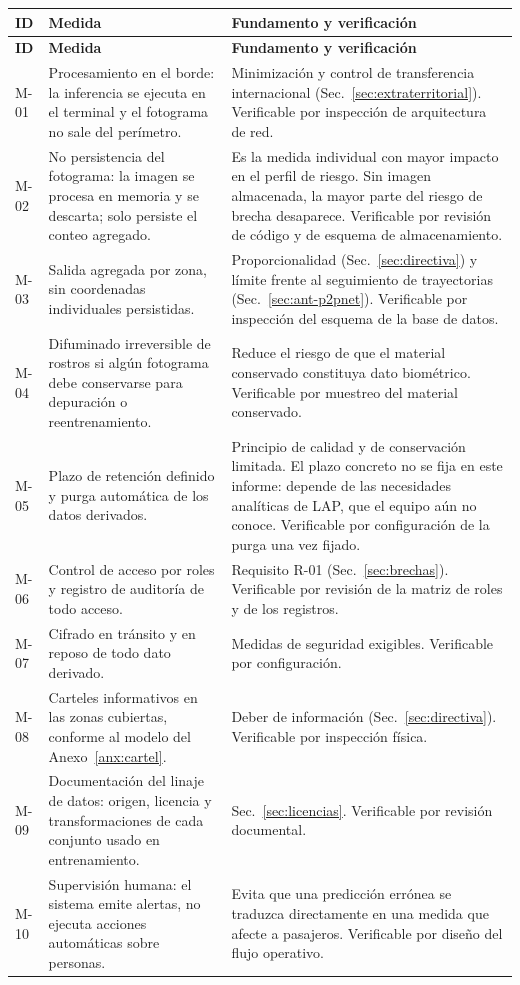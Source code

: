 {\footnotesize
\begin{longtable}{@{}L{1.1cm}L{4.3cm}L{6.6cm}@{}}
\toprule
\textbf{ID} & \textbf{Medida} & \textbf{Fundamento y verificación} \\
\midrule
\endfirsthead
\toprule
\textbf{ID} & \textbf{Medida} & \textbf{Fundamento y verificación} \\
\midrule
\endhead
\bottomrule
\endfoot
M-01 & Procesamiento en el borde: la inferencia se ejecuta en el
terminal y el fotograma no sale del perímetro. &
Minimización y control de transferencia internacional
(Sec.~\ref{sec:extraterritorial}). Verificable por inspección de
arquitectura de red. \\
\addlinespace
M-02 & No persistencia del fotograma: la imagen se procesa en memoria y
se descarta; solo persiste el conteo agregado. &
Es la medida individual con mayor impacto en el perfil de riesgo. Sin
imagen almacenada, la mayor parte del riesgo de brecha desaparece.
Verificable por revisión de código y de esquema de almacenamiento. \\
\addlinespace
M-03 & Salida agregada por zona, sin coordenadas individuales
persistidas. &
Proporcionalidad (Sec.~\ref{sec:directiva}) y límite frente al
seguimiento de trayectorias (Sec.~\ref{sec:ant-p2pnet}). Verificable por
inspección del esquema de la base de datos. \\
\addlinespace
M-04 & Difuminado irreversible de rostros si algún fotograma debe
conservarse para depuración o reentrenamiento. &
Reduce el riesgo de que el material conservado constituya dato
biométrico. Verificable por muestreo del material conservado. \\
\addlinespace
M-05 & Plazo de retención definido y purga automática de los datos
derivados. &
Principio de calidad y de conservación limitada. El plazo concreto no se
fija en este informe: depende de las necesidades analíticas de LAP, que
el equipo aún no conoce. Verificable por configuración de la purga una
vez fijado. \\
\addlinespace
M-06 & Control de acceso por roles y registro de auditoría de todo
acceso. &
Requisito R-01 (Sec.~\ref{sec:brechas}). Verificable por revisión de la
matriz de roles y de los registros. \\
\addlinespace
M-07 & Cifrado en tránsito y en reposo de todo dato derivado. &
Medidas de seguridad exigibles. Verificable por configuración. \\
\addlinespace
M-08 & Carteles informativos en las zonas cubiertas, conforme al modelo
del Anexo~\ref{anx:cartel}. &
Deber de información (Sec.~\ref{sec:directiva}). Verificable por
inspección física. \\
\addlinespace
M-09 & Documentación del linaje de datos: origen, licencia y
transformaciones de cada conjunto usado en entrenamiento. &
Sec.~\ref{sec:licencias}. Verificable por revisión documental. \\
\addlinespace
M-10 & Supervisión humana: el sistema emite alertas, no ejecuta acciones
automáticas sobre personas. &
Evita que una predicción errónea se traduzca directamente en una medida
que afecte a pasajeros. Verificable por diseño del flujo operativo. \\
\end{longtable}}

